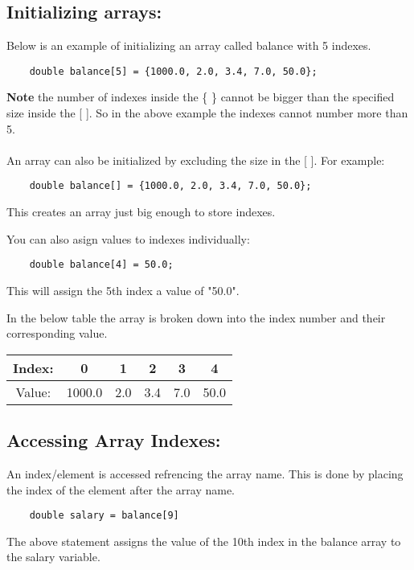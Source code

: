 \documentclass[
	12pt, %
]{fphw}
\begin{document}
\subsection*{Initializing arrays:}
Below is an example of initializing an array called balance with 5 indexes.
\begin{lstlisting}
	double balance[5] = {1000.0, 2.0, 3.4, 7.0, 50.0};
\end{lstlisting}
\textbf{Note} the number of indexes inside the \{ \} cannot be bigger than the 
specified size inside the [ ]. So in the above example the indexes cannot 
number more than 5.\\ \\


An array can also be initialized by excluding the size in the [ ]. 
For example:
\begin{lstlisting}
	double balance[] = {1000.0, 2.0, 3.4, 7.0, 50.0};
\end{lstlisting}
This creates an array just big enough to store indexes.

You can also asign values to indexes individually:
\begin{lstlisting}
	double balance[4] = 50.0;
\end{lstlisting}
This will assign the 5th index a value of "50.0".

In the below table the array is broken down into the index number and their 
corresponding value. \\
\begin{center}
	\begin{tabular}{||c | c | c | c | c | c ||} 
		\hline
		Index: & 0 &  1 & 2 & 3 & 4 \\ 
		\hline
		Value: & 1000.0 & 2.0 & 3.4 & 7.0 & 50.0 \\ 
		\hline
	\end{tabular}
\end{center}

\subsection*{Accessing Array Indexes:}
An index/element is accessed refrencing the array name. This is done by placing 
the index of the element after the array name.
\begin{lstlisting}
	double salary = balance[9]
\end{lstlisting}
The above statement assigns the value of the 10th index in the balance array 
to the salary variable.
\end{document}
